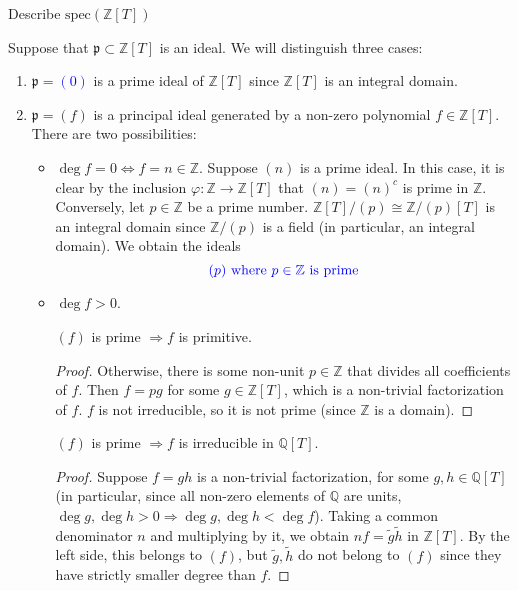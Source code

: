 \begin{problem}
Describe $\text{spec}(\mathbb{Z}[T])$
\begin{sol}
    Suppose that $\mathfrak{p} \subset \mathbb{Z}[T]$ is an ideal.
    We will distinguish three cases:
    \begin{enumerate}
        \item $\mathfrak{p} = $\textcolor{blue}{$(0)$}
        is a prime ideal of $\mathbb{Z}[T]$ since $\mathbb{Z}[T]$ is an integral domain.
        \item $\mathfrak{p} = (f)$ is a principal ideal generated by a non-zero polynomial $f \in \mathbb{Z}[T]$.
        There are two possibilities:
        \begin{itemize}

            \item $\deg f = 0 \Leftrightarrow f = n \in \mathbb{Z}$.
            Suppose $(n)$ is a prime ideal.
            In this case, it is clear by the inclusion $\varphi:\mathbb{Z} \to \mathbb{Z}[T]$ that $(n) = (n)^c$ is prime in $\mathbb{Z}$.
            Conversely, let $p \in \mathbb{Z}$ be a prime number. $\mathbb{Z}[T]/(p) \cong \mathbb{Z}/(p)[T]$
            is an integral domain since $\mathbb{Z}/(p)$ is a field (in particular, an integral domain).
            We obtain the ideals
            \[
                 \textcolor{blue}{(p) \text{ where } p \in \mathbb{Z} \text{ is prime}}
            \]
            \item $\deg f > 0$.
            \begin{claim}
                $(f)$ is prime $\Rightarrow f$ is primitive.
                \begin{proof}
                    Otherwise, there is some non-unit $p \in \mathbb{Z}$ that divides all coefficients of $f$.
                    Then $f = pg$ for some $g \in \mathbb{Z}[T]$, which is a non-trivial factorization of $f$.
                    $f$ is not irreducible, so it is not prime (since $\mathbb{Z}$ is a domain).
                \end{proof}
            \end{claim}
            \begin{claim}
                $(f)$ is prime $\Rightarrow f$ is irreducible in $\mathbb{Q}[T]$.
                \begin{proof}
                    Suppose $f = gh$ is a non-trivial factorization, for some $g,h \in \mathbb{Q}[T]$ (in particular, since all non-zero elements of $\mathbb{Q}$ are units, $\deg g, \deg h > 0 \Rightarrow \deg g, \deg h < \deg f$).
                    Taking a common denominator $n$ and multiplying by it, we obtain $nf = \tilde{g}\tilde{h}$ in $\mathbb{Z}[T]$.
                    By the left side, this belongs to $(f)$, but $\tilde{g}, \tilde{h}$ do not belong to $(f)$ since they have strictly smaller degree than $f$.
                \end{proof}
            \end{claim}


\end{itemize}
\end{enumerate}
\end{sol}
\end{problem}
